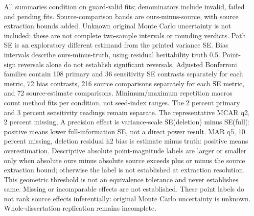 All summaries condition on guard-valid fits; denominators include invalid, failed and pending fits. Source-comparison bands are ours-minus-source, with source extraction bounds added. Unknown original Monte Carlo uncertainty is not included: these are not complete two-sample intervals or rounding verdicts. Path SE is an exploratory different estimand from the printed variance SE. Bias intervals describe ours-minus-truth, using residual heritability truth 0.5. Point-sign reversals alone do not establish significant reversals. Adjusted Bonferroni families contain 108 primary and 36 sensitivity SE contrasts separately for each metric, 72 bias contrasts, 216 source comparisons separately for each SE metric, and 72 source-estimate comparisons. Minimum/maximum repetition macros count method fits per condition, not seed-index ranges. The 2 percent primary and 3 percent sensitivity readings remain separate. The representative MCAR q2, 2 percent missing, A precision effect is variance-scale SE(deletion) minus SE(full): positive means lower full-information SE, not a direct power result. MAR q5, 10 percent missing, deletion residual h2 bias is estimate minus truth: positive means overestimation. Descriptive absolute point-magnitude labels are larger or smaller only when absolute ours minus absolute source exceeds plus or minus the source extraction bound; otherwise the label is not established at extraction resolution. This geometric threshold is not an equivalence tolerance and never establishes same. Missing or incomparable effects are not established. These point labels do not rank source effects inferentially: original Monte Carlo uncertainty is unknown. Whole-dissertation replication remains incomplete.
